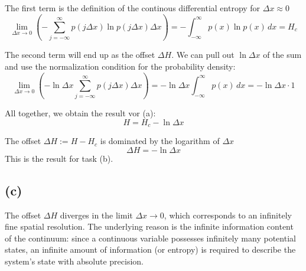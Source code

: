 \documentclass{article}
\begin{document}
The first term is the definition of the continous differential entropy for $\Delta x \approx 0$
$$\lim_{\Delta x \to 0} \left( - \sum_{j=-\infty}^{\infty} p(j \Delta x) \ln p(j \Delta x) \Delta x \right) = - \int_{-\infty}^{\infty} p(x) \ln p(x) \, dx = H_c$$

The second term will end up as the offset $\Delta H$. We can pull out $\ln \Delta x$ of the sum and use the normalization condition for the probability density:
$$\lim_{\Delta x \to 0} \left( - \ln \Delta x \sum_{j=-\infty}^{\infty} p(j \Delta x) \Delta x \right) = - \ln \Delta x \int_{-\infty}^{\infty} p(x) \, dx = - \ln \Delta x \cdot 1$$

All together, we obtain the result vor (a):
$$H = H_c - \ln \Delta x$$

The offset $\Delta H := H - H_c$ is dominated by the logarithm of $\Delta x$
$$\Delta H = - \ln \Delta x $$
This is the result for task (b).

\subsection*{(c)}

The offset $\Delta H$ diverges in the limit $\Delta x \to 0$, which corresponds to an infinitely fine spatial resolution. The underlying reason is the infinite information content of the continuum: since a continuous variable possesses infinitely many potential states, an infinite amount of information (or entropy) is required to describe the system's state with absolute precision.
\end{document}

